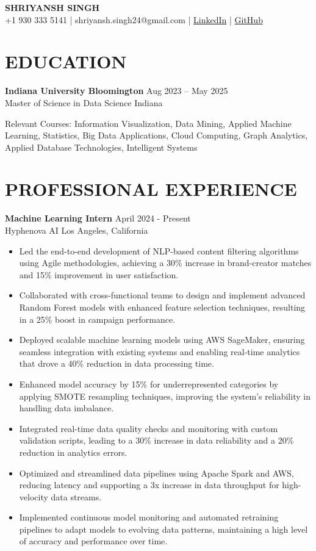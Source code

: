 \documentclass[12pt,a4paper]{article}
\newcommand{\cvitem}[4]{
  \textbf{#1} \hfill #2\\
  #3 \hfill #4 \par\vspace{-0.5em} %
}
\newcommand{\workexp}[4]{
  \textbf{#1} \hfill #2\\
  #3 \hfill #4\\
  \vspace{-1em} %
}
\begin{document}
\begin{center}
\textbf{\LARGE SHRIYANSH SINGH}\\
\normalsize
+1 930 333 5141 | shriyansh.singh24@gmail.com | \href{https://www.linkedin.com/in/shriyansh-bir-singh}{LinkedIn} | \href{https://github.com/shriyansh24}{GitHub}
\end{center}

\section*{EDUCATION}
\cvitem{Indiana University Bloomington}{Aug 2023 – May 2025}{Master of Science in Data Science}{Indiana}
\textnormal{Relevant Courses:} Information Visualization, Data Mining, Applied Machine Learning, Statistics, Big Data Applications, Cloud Computing, Graph Analytics, Applied Database Technologies, Intelligent Systems

\section*{PROFESSIONAL EXPERIENCE}
\workexp{Machine Learning Intern}{April 2024 - Present}{Hyphenova AI}{Los Angeles, California}
\begin{itemize}[leftmargin=*,noitemsep,topsep=0pt]
\item Led the end-to-end development of NLP-based content filtering algorithms using Agile methodologies, achieving a 30\% increase in brand-creator matches and 15\% improvement in user satisfaction.
\item Collaborated with cross-functional teams to design and implement advanced Random Forest models with enhanced feature selection techniques, resulting in a 25\% boost in campaign performance.
\item Deployed scalable machine learning models using AWS SageMaker, ensuring seamless integration with existing systems and enabling real-time analytics that drove a 40\% reduction in data processing time.
\item Enhanced model accuracy by 15\% for underrepresented categories by applying SMOTE resampling techniques, improving the system's reliability in handling data imbalance.
\item Integrated real-time data quality checks and monitoring with custom validation scripts, leading to a 30\% increase in data reliability and a 20\% reduction in analytics errors.
\item Optimized and streamlined data pipelines using Apache Spark and AWS, reducing latency and supporting a 3x increase in data throughput for high-velocity data streams.
\item Implemented continuous model monitoring and automated retraining pipelines to adapt models to evolving data patterns, maintaining a high level of accuracy and performance over time.
\end{itemize}
\end{document}
